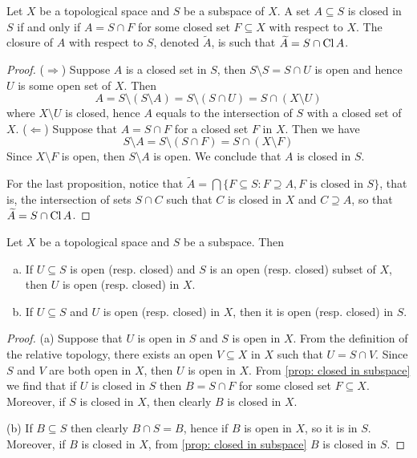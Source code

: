 \begin{proposition}\label{prop: closed in subspace}
Let \(X\) be a topological space and \(S\) be a subspace of \(X\). A set
\(A \subseteq S\) is closed in \(S\) if and only if \(A = S \cap F\) for some
closed set \(F \subseteq X\) with respect to \(X\). The closure of \(A\) with
respect to \(S\), denoted \(\widetilde A\), is such that
\(\widetilde A = S \cap \operatorname{Cl} A\).
\end{proposition}

\begin{proof}
(\(\Rightarrow\)) Suppose \(A\) is a closed set in \(S\), then \(S \setminus
S = S \cap U\) is open and hence \(U\) is some open set of \(X\). Then
\[
  A = S \setminus (S \setminus A) = S \setminus (S \cap U)
  = S \cap (X \setminus U)
\]
where \(X \setminus U\) is closed, hence \(A\) equals to the intersection of
\(S\) with a closed set of \(X\).
(\(\Leftarrow\)) Suppose that \(A = S \cap F\) for a closed set \(F\) in
\(X\). Then we have
\[
  S \setminus A = S \setminus (S \cap F) = S \cap (X \setminus F)
\]
Since \(X\setminus F\) is open, then \(S \setminus A\) is open. We conclude
that \(A\) is closed in \(S\).

For the last proposition, notice that \(\widetilde A = \bigcap \{F \subseteq S
\colon F \supseteq A, F \text{ is closed in } S\}\), that is, the intersection of
sets \(S \cap C\) such that \(C\) is closed in \(X\) and \(C \supseteq A\), so
that \(\widetilde A = S \cap \operatorname{Cl} A\).
\end{proof}

\begin{proposition}\label{prop: relative open to open}
Let \(X\) be a topological space and \(S\) be a subspace. Then
\begin{enumerate}[(a)]
  \item If \(U \subseteq S\) is open (resp. closed) and \(S\) is an open
    (resp. closed) subset of \(X\), then \(U\) is open (resp. closed) in
    \(X\).
  \item If \(U \subseteq S\) and \(U\) is open (resp. closed) in \(X\), then
    it is open (resp. closed) in \(S\).
\end{enumerate}
\end{proposition}

\begin{proof}
(a) Suppose that \(U\) is open in \(S\) and \(S\) is open in \(X\). From the
definition of the relative topology, there exists an open \(V \subseteq X\) in
\(X\) such that \(U = S \cap V\). Since \(S\) and \(V\) are both open in
\(X\), then \(U\) is open in \(X\). From \cref{prop: closed in subspace} we
find that if \(U\) is closed in \(S\) then \(B = S \cap F\) for some closed
set \(F \subseteq X\). Moreover, if \(S\) is closed in \(X\), then clearly
\(B\) is closed in \(X\).

(b) If \(B \subseteq S\) then clearly \(B \cap S = B\), hence if \(B\) is open
in \(X\), so it is in \(S\). Moreover, if \(B\) is closed in \(X\), from
\cref{prop: closed in subspace} \(B\) is closed in \(S\).
\end{proof}

